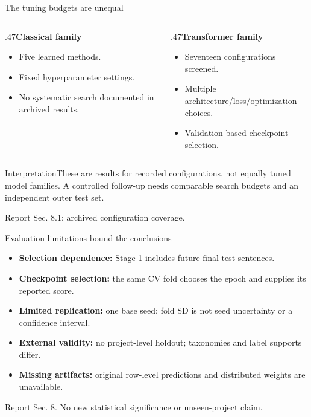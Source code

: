 \documentclass[aspectratio=169,10pt]{beamer}
\newcommand{\src}[1]{\vfill{\tiny\color{gray}#1\par}}
\begin{document}
\begin{frame}{The tuning budgets are unequal}
\begin{columns}[T]
\begin{column}{.47\textwidth}\textbf{Classical family}\medskip
\begin{itemize}\item Five learned methods.
\item Fixed hyperparameter settings.
\item No systematic search documented in archived results.\end{itemize}\end{column}
\begin{column}{.47\textwidth}\textbf{Transformer family}\medskip
\begin{itemize}\item Seventeen configurations screened.
\item Multiple architecture/loss/optimization choices.
\item Validation-based checkpoint selection.\end{itemize}\end{column}\end{columns}
\medskip
\begin{block}{Interpretation}These are results for recorded configurations, not equally tuned model families. A controlled follow-up needs comparable search budgets and an independent outer test set.\end{block}
\src{Report Sec. 8.1; archived configuration coverage.}
\end{frame}

\begin{frame}{Evaluation limitations bound the conclusions}
\begin{itemize}\item \textbf{Selection dependence:} Stage 1 includes future final-test sentences.
\medskip\item \textbf{Checkpoint selection:} the same CV fold chooses the epoch and supplies its reported score.
\medskip\item \textbf{Limited replication:} one base seed; fold SD is not seed uncertainty or a confidence interval.
\medskip\item \textbf{External validity:} no project-level holdout; taxonomies and label supports differ.
\medskip\item \textbf{Missing artifacts:} original row-level predictions and distributed weights are unavailable.\end{itemize}
\src{Report Sec. 8. No new statistical significance or unseen-project claim.}
\end{frame}
\end{document}
